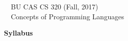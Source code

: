 \documentclass[11pt]{article}
\begin{document}
\begin{flushright}
\begin{minipage}{430pt}
{
\begin{flushleft}
{~~\large\sc BU CAS CS 320 (Fall, 2017)} \\
{~~\LARGE\sc Concepts of Programming Languages}
\end{flushleft}
}
\end{minipage}
\end{flushright}

\vspace{12pt}
\begin{center}
\begin{minipage}{16cm}
\begin{center}
{\LARGE\bf Syllabus} \\[12pt]
\end{center}
\end{minipage}
\end{center}

\thispagestyle{empty}
\end{document}
